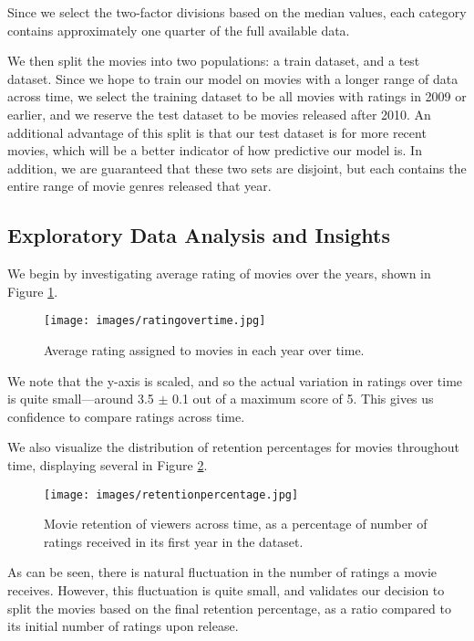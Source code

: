 \documentclass[12pt]{article}
\begin{document}
\newpage
Since we select the two-factor divisions based on the median values, each category contains approximately one quarter of the full available data.

We then split the movies into two populations: a train dataset, and a test dataset. Since we hope to train our model on movies with a longer range of data across time, we select the training dataset to be all movies with ratings in 2009 or earlier, and we reserve the test dataset to be movies released after 2010. An additional advantage of this split is that our test dataset is for more recent movies, which will be a better indicator of how predictive our model is. In addition, we are guaranteed that these two sets are disjoint, but each contains the entire range of movie genres released that year.


\subsection{Exploratory Data Analysis and Insights}
We begin by investigating average rating of movies over the years, shown in Figure \ref{fig:ratingovertime}. 
\label{sec:EDA}
\begin{figure}
    \centering
    \texttt{[image: images/ratingovertime.jpg]}
    \caption{Average rating assigned to movies in each year over time.}
    \label{fig:ratingovertime}
\end{figure}

We note that the y-axis is scaled, and so the actual variation in ratings over time is quite small—around 3.5 $\pm$ 0.1 out of a maximum score of 5. This gives us confidence to compare ratings across time.

We also visualize the distribution of retention percentages for movies throughout time, displaying several in Figure \ref{fig:retentionpercentage}.

\begin{figure}
    \centering
    \texttt{[image: images/retentionpercentage.jpg]}
    \caption{Movie retention of viewers across time, as a percentage of number of ratings received in its first year in the dataset.}
    \label{fig:retentionpercentage}
\end{figure}

As can be seen, there is natural fluctuation in the number of ratings a movie receives. However, this fluctuation is quite small, and validates our decision to split the movies based on the final retention percentage, as a ratio compared to its initial number of ratings upon release.
\end{document}
